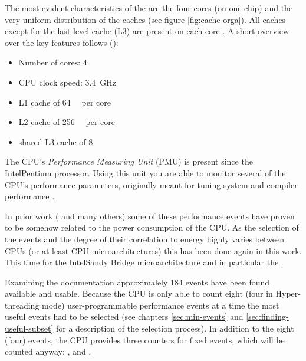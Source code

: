 The most evident characteristics of the \JWPcpu are the four cores (on one chip)
and the very uniform distribution of the caches (see figure
\ref{fig:cache-orga}). All caches except for the last-level cache (L3) are
present on each core \cite{fog11}. A short overview over the key features
follows (\cite{intel2011spec}):

\begin{itemize}

\item Number of cores: 4

\item CPU clock speed: \SI{3.4}{\giga\hertz}

\item L1 cache of \SI{64}{\kibi\byte} per core\cite{intel2011softdev1}

\item L2 cache of \SI{256}{\kibi\byte} per core\cite{intel2011softdev1}

\item shared L3 cache of \SI{8}{\mebi\byte}\cite{intel2011softdev1}

\end{itemize}


\label{sec:pmu}

The CPU's \emph{Performance Measuring Unit} (PMU) is present since the
Intel\TReg Pentium processor. Using this unit you are able to monitor several of
the CPU's performance parameters, originally meant for tuning system and
compiler performance \cite{intel2011softdev3b}.

In prior work (\cite{bellosa2000benefits,snowdon2010operating,
weissel2002process,kellner03tempcontrol,bertran2010decomposable} and many
others) some of these performance events have proven to be somehow related to
the power consumption of the CPU. As the selection of the events and the degree
of their correlation to energy highly varies between CPUs (or at least CPU
microarchitectures) this has been done again in this work. This time for the
Intel\TReg Sandy Bridge microarchitecture and in particular the \JWPcpu.

Examining the documentation \cite{intel2011events} approximalely 184 events have
been found available and usable. Because the CPU is only able to count eight
(four in Hyper-threading \cite{wiki:HT} mode) user-programmable performance
events at a time \cite{intel2011softdev1} the most useful events had to be
selected (see chapters \ref{sec:min-events} and \ref{sec:finding-useful-subset}
for a description of  the selection process). In addition to the eight (four)
events, the CPU provides three counters for fixed events, which will be counted
anyway: , 
and .

